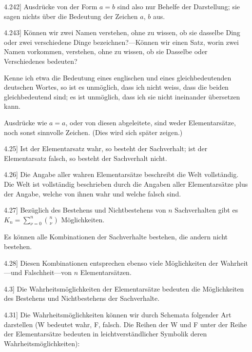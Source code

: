 \documentclass[12pt,oneside]{book}[2007/10/19]
\newcommand{\PropERef}[1]{\hyperref[PropE:#1]{#1}}
\newcommand{\PropositionG}[2]{%
  \item[\phantomsection\label{PropG:#1}\PropERef{#1}] #2%
}
\begin{document}
\begin{propositions}
\PropositionG{4.242}
{Ausdrücke von der Form \glqq{}$a = b$\grqq{} sind also nur
Behelfe der Darstellung; sie sagen nichts über die
Bedeutung der Zeichen \glqq{}$a$\grqq{}, \glqq{}$b$\grqq{} aus.}


\PropositionG{4.243}
{Können wir zwei Namen verstehen, ohne zu
wissen, ob sie dasselbe Ding oder zwei verschiedene
Dinge bezeichnen?---Können wir einen Satz,
worin zwei Namen vorkommen, verstehen, ohne
zu wissen, ob sie Dasselbe oder Verschiedenes
bedeuten?

Kenne ich etwa die Bedeutung eines englischen
und eines gleichbedeutenden deutschen Wortes, so
ist es unmöglich, dass ich nicht weiss, dass die
beiden gleichbedeutend sind; es ist unmöglich,
dass ich sie nicht ineinander übersetzen kann.

Ausdrücke wie \glqq{}$a = a$\grqq{}, oder von diesen abgeleitete,
sind weder Elementarsätze, noch sonst sinnvolle
Zeichen. (Dies wird sich später zeigen.)}


\PropositionG{4.25}
{Ist der Elementarsatz wahr, so besteht der
Sachverhalt; ist der Elementarsatz falsch, so besteht
der Sachverhalt nicht.}


\PropositionG{4.26}
{Die Angabe aller wahren Elementarsätze beschreibt
die Welt vollständig. Die Welt ist
vollständig beschrieben durch die Angaben aller
Elementarsätze plus der Angabe, welche von ihnen
wahr und welche falsch sind.}


\PropositionG{4.27}
{Bezüglich des Bestehens und Nichtbestehens von
\enlargethispage{9pt} %
$n$ Sachverhalten gibt es $K_{n} = \sum\limits_{\nu = 0}^n\binom{n}{\nu}$ Möglichkeiten.

Es können alle Kombinationen der Sachverhalte
bestehen, die andern nicht bestehen.}


\PropositionG{4.28}
{Diesen Kombinationen entsprechen ebenso viele
Möglichkeiten der Wahr\-heit---und Falschheit---von
$n$ Elementarsätzen.}


\PropositionG{4.3}
{Die Wahrheitsmöglichkeiten der Elementarsätze
bedeuten die Möglichkeiten des Bestehens und
Nichtbestehens der Sachverhalte.}


\PropositionG{4.31}
{Die Wahrheitsmöglichkeiten können wir durch
Schemata folgender Art darstellen (\glqq{}W\grqq{} bedeutet
\glqq{}wahr\grqq{}, \glqq{}F\grqq{}, \glqq{}falsch\grqq{}. Die Reihen der \glqq{}W\grqq{} und
\glqq{}F\grqq{} unter der Reihe der Elementarsätze bedeuten
in leichtverständlicher Symbolik deren Wahrheitsmöglichkeiten):

}
\end{propositions}
\end{document}
